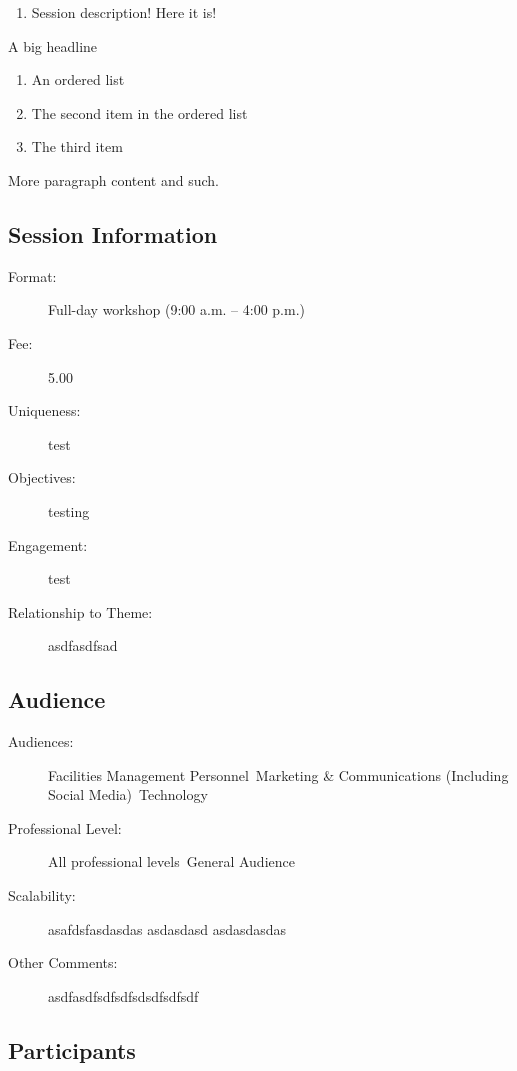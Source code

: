 \documentclass{report}
\begin{document}
              \begin{enumerate}
\item Session description! Here it is!
\end{enumerate}
A big headline\newline
\begin{enumerate}
\item An ordered list
\item The second item in the ordered list
\item The third item
\end{enumerate}
More paragraph content and such.

              \subsection*{Session Information}
                \begin{description}
                  \item [Format:] Full-day workshop (9:00 a.m. – 4:00 p.m.)
							    
								  \item [Fee:]5.00
							     
							    \item [Uniqueness:]test
							    \item [Objectives:]testing
							    \item [Engagement:]test
							    \item [Relationship to Theme:]asdfasdfsad
							    
                \end{description}
              \subsection*{Audience}
                \begin{description}
                  \item [Audiences:]Facilities Management Personnel~Marketing \& Communications (Including Social Media)~Technology~
                  \item[Professional Level:]All professional levels~General Audience~
                \item[Scalability:] asafdsfasdasdas
asdasdasd
asdasdasdas

							
              \item[Other Comments:] asdfasdfsdfsdfsdsdfsdfsdf
              \end{description}
            \subsection*{Participants}
\end{document}
